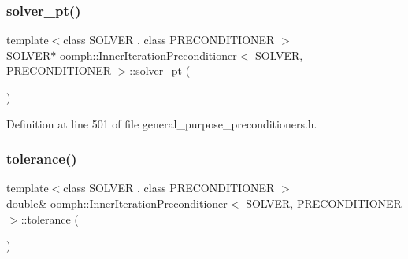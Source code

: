 \mbox{\label{classoomph_1_1InnerIterationPreconditioner_aa32c5dc72b1384a8f7345e2d37421f43}} 
\subsubsection{\texorpdfstring{solver\+\_\+pt()}{solver\_pt()}}
{\footnotesize\ttfamily template$<$class S\+O\+L\+V\+ER , class P\+R\+E\+C\+O\+N\+D\+I\+T\+I\+O\+N\+ER $>$ \\
S\+O\+L\+V\+ER$\ast$ \hyperlink{classoomph_1_1InnerIterationPreconditioner}{oomph\+::\+Inner\+Iteration\+Preconditioner}$<$ S\+O\+L\+V\+ER, P\+R\+E\+C\+O\+N\+D\+I\+T\+I\+O\+N\+ER $>$\+::solver\+\_\+pt (\begin{DoxyParamCaption}{ }\end{DoxyParamCaption})\hspace{0.3cm}{\ttfamily [inline]}}



Definition at line 501 of file general\+\_\+purpose\+\_\+preconditioners.\+h.

\mbox{\label{classoomph_1_1InnerIterationPreconditioner_a5b5eff9d8ce065d88f328c7d028ed578}} 
\subsubsection{\texorpdfstring{tolerance()}{tolerance()}}
{\footnotesize\ttfamily template$<$class S\+O\+L\+V\+ER , class P\+R\+E\+C\+O\+N\+D\+I\+T\+I\+O\+N\+ER $>$ \\
double\& \hyperlink{classoomph_1_1InnerIterationPreconditioner}{oomph\+::\+Inner\+Iteration\+Preconditioner}$<$ S\+O\+L\+V\+ER, P\+R\+E\+C\+O\+N\+D\+I\+T\+I\+O\+N\+ER $>$\+::tolerance (\begin{DoxyParamCaption}{ }\end{DoxyParamCaption})\hspace{0.3cm}{\ttfamily [inline]}}



